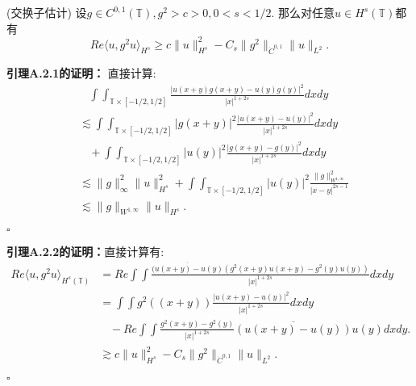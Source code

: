 \begin{lem}
\songti\rm (交换子估计) 设$g\in C^{0,1}(\mathbb{T}),g^2>c>0,0<s<1/2.$ 那么对任意$u\in H^s(\mathbb{T})$都有
\[
Re\langle u,g^2u\rangle _{H^s}\geq c\|u\|_{H^s}^2-C_s\|g^2\|_{\dot{C}^{0,1}}\|u\|_{L^2}.
\]
\end{lem}

\textbf{引理A.2.1的证明：} 直接计算:
\[
\begin{aligned}
&~~~~\int\int_{\mathbb{T}\times [-1/2,1/2]}\frac{|u(x+y)g(x+y)-u(y)g(y)|^2}{|x|^{1+2s}}dxdy \\
&\lesssim \int\int_{\mathbb{T}\times [-1/2,1/2]}|g(x+y)|^2\frac{|u(x+y)-u(y)|^2}{|x|^{1+2s}}dxdy\\
&~~~~+\int\int_{\mathbb{T}\times [-1/2,1/2]}|u(y)|^2\frac{|g(x+y)-g(y)|^2}{|x|^{1+2s}}dxdy \\
&\lesssim\|g\|_{\infty}^2\|u\|_{H^s}^2+\int\int_{\mathbb{T}\times [-1/2,1/2]}|u(y)|^2\frac{\|g\|_{W^{1,\infty}}^2}{|x-y|^{2s-1}}\\
&\lesssim \|g\|_{W^{1,\infty}}\|u\|_{H^s}.
\end{aligned}
\]
\begin{flushright}
$\square$
\end{flushright}

\textbf{引理A.2.2的证明：}直接计算有:
\[
\begin{aligned}
Re\langle u,g^2 u\rangle_{H^s(\mathbb{T})}&= Re\int\int\frac{\overline{(u(x+y)-u(y)}(g^2(x+y)u(x+y)-g^2(y)u(y))}{|x|^{1+2s}}dxdy \\
&=\int\int g^2((x+y))\frac{|u(x+y)-u(y)|^2}{|x|^{1+2s}}dxdy \\
&~~~~-Re\int\int\frac{g^2(x+y)-g^2(y)}{|x|^{1+2s}}\overline{(u(x+y)-u(y))}u(y)dxdy.\\
&\gtrsim c\|u\|_{H^s}^2-C_s\|g^2\|_{\dot{C}^{0,1}}\|u\|_{L^2}.
\end{aligned}
\]
\begin{flushright}
$\square$
\end{flushright}
